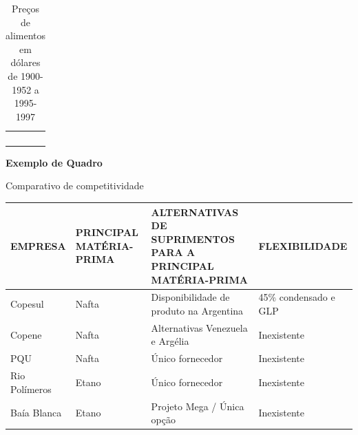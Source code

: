 \begin{table}[ht]
\centering
\caption{Preços de alimentos em dólares de 1900-1952 a
1995-1997}
\begin{supertabular}{m{3.6cm}m{3.7cm}m{3.6cm}m{3.0cm}}
\hline
{} &
 &
 &
\centering{}\\\hline
{} &
 &
 &
\centering{}\\
 &
 &
 &
\centering{}\\
 &
 &
 &
\centering{}\\
 &
 &
 &
\centering{}\\\hline
\end{supertabular}
    \label{tab:alimentos}
\end{table}

\bigskip

{\centering\bfseries\color{red}
Exemplo de Quadro
\par}

\begin{quadro}[htb]
\centering
\caption{Comparativo de competitividade}
\begin{supertabular}{|m{2.5cm}|m{2.5cm}|m{6.0cm}|m{3.2cm}|}
\hline
{ EMPRESA } &
{ PRINCIPAL MATÉRIA-PRIMA } &
{ ALTERNATIVAS DE SUPRIMENTOS PARA A PRINCIPAL MATÉRIA-PRIMA } &
{ FLEXIBILIDADE }\\\hline
{ Copesul } &
{ Nafta } &
{ Disponibilidade de produto na Argentina} &
{ 45\% condensado e GLP }\\\hline
{ Copene } &
{ Nafta } &
{ Alternativas Venezuela e Argélia } &
{ Inexistente }\\\hline
{ PQU } &
{ Nafta } &
{ Único fornecedor } &
{ Inexistente }\\\hline
{ Rio Polímeros } &
{ Etano } &
{ Único fornecedor } &
{ Inexistente }\\\hline
{ Baía Blanca } &
{ Etano } &
{ Projeto Mega / Única opção } &
{ Inexistente }\\\hline
\end{supertabular}
    \label{quad:quadro1}
\end{quadro}

